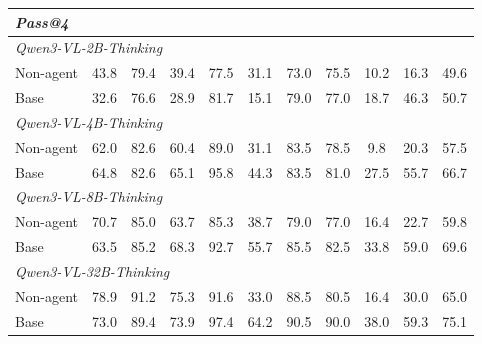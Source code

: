 \begin{table}[t]
{\begin{tabular}{l ccc cccc cc >{\columncolor{mygray}}c}
        \multicolumn{11}{l}{\textit{Pass@4}} \\
        \midrule
        \multicolumn{11}{l}{\textit{Qwen3-VL-2B-Thinking}} \\
        Non-agent
            & 43.8 & 79.4 & 39.4 & 77.5 & 31.1 & 73.0 & 75.5 & 10.2 & 16.3 & 49.6 \\
        Base
            & 32.6 & 76.6 & 28.9 & 81.7 & 15.1 & 79.0 & 77.0 & 18.7 & 46.3 & 50.7 \\
        \midrule
        \multicolumn{11}{l}{\textit{Qwen3-VL-4B-Thinking}} \\
        Non-agent
            & 62.0 & 82.6 & 60.4 & 89.0 & 31.1 & 83.5 & 78.5 & 9.8 & 20.3 & 57.5 \\
        Base
            & 64.8 & 82.6 & 65.1 & 95.8 & 44.3 & 83.5 & 81.0 & 27.5 & 55.7 & 66.7 \\
        \midrule
        \multicolumn{11}{l}{\textit{Qwen3-VL-8B-Thinking}} \\
        Non-agent
            & 70.7 & 85.0 & 63.7 & 85.3 & 38.7 & 79.0 & 77.0 & 16.4 & 22.7 & 59.8 \\
        Base
            & 63.5 & 85.2 & 68.3 & 92.7 & 55.7 & 85.5 & 82.5 & 33.8 & 59.0 & 69.6 \\
        \midrule
        \multicolumn{11}{l}{\textit{Qwen3-VL-32B-Thinking}} \\
        Non-agent
            & 78.9 & 91.2 & 75.3 & 91.6 & 33.0 & 88.5 & 80.5 & 16.4 & 30.0 & 65.0 \\
        Base
            & 73.0 & 89.4 & 73.9 & 97.4 & 64.2 & 90.5 & 90.0 & 38.0 & 59.3 & 75.1 \\

        \bottomrule
    \end{tabular}
    }
\vspace{-0.2in}
\end{table}
